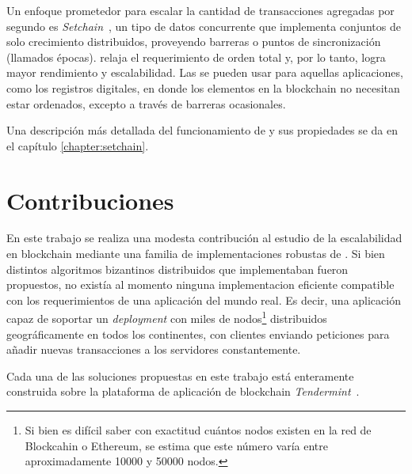 %
Un enfoque prometedor para escalar la cantidad de transacciones agregadas por segundo
es \textit{Setchain}~\cite{Capretto.2022.Setchain},
un tipo de datos concurrente que implementa conjuntos de solo crecimiento distribuidos,
proveyendo barreras o puntos de sincronización (llamados épocas).
%
\setchain relaja el requerimiento de orden total y, por lo tanto, logra mayor
rendimiento y escalabilidad.
%
Las \setchains se pueden usar para aquellas aplicaciones, como los registros digitales,
en donde los elementos en la blockchain no necesitan estar ordenados, excepto a través
de barreras ocasionales.

Una descripción más detallada del funcionamiento de \setchain y sus propiedades se da
en el capítulo \ref{chapter:setchain}.

\section{Contribuciones}
En este trabajo se realiza una modesta contribución al estudio de la escalabilidad en blockchain mediante 
una familia de implementaciones robustas de \setchain.
%
Si bien distintos algoritmos bizantinos distribuidos que implementaban \setchain fueron
propuestos, no existía al momento ninguna implementacion eficiente compatible con
los requerimientos de una aplicación del mundo real.
Es decir, una aplicación capaz de soportar un \textit{deployment} con miles de nodos\footnote{Si bien
es difícil saber con exactitud cuántos nodos existen en la red de Blockcahin o Ethereum, se estima
que este número varía entre aproximadamente 10000 y 50000 nodos.}
distribuidos geográficamente en todos los continentes, con clientes enviando peticiones para
añadir nuevas transacciones a los servidores constantemente.

Cada una de las soluciones propuestas en este trabajo está enteramente construida sobre 
la plataforma de aplicación de blockchain \textit{Tendermint}~\cite{Buchman.2018.Tendermint}.



